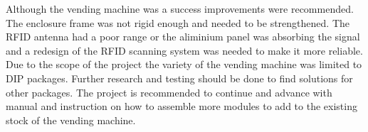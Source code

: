 \documentclass[a4paper,11pt]{article}
\numberwithin{figure}{section}
\numberwithin{table}{section}
\begin{document}
Although the vending machine was a success improvements were recommended. The enclosure frame was not rigid enough and needed to be strengthened. The RFID antenna had a poor range or the aliminium panel was absorbing the signal and a redesign of the RFID scanning system was needed to make it more reliable. Due to the scope of the project the variety of the vending machine was limited to DIP packages. Further research and testing should be done to find solutions for other packages. The project is recommended to continue and advance with manual and instruction on how to assemble more modules to add to the existing stock of the vending machine.
	
	\newpage	
	\tableofcontents
	\newpage
	\listoffigures
	\newpage
	\listoftables
	\newpage
	
	\mbox{}
	\printnomenclature[2cm]	
	
\end{document}
